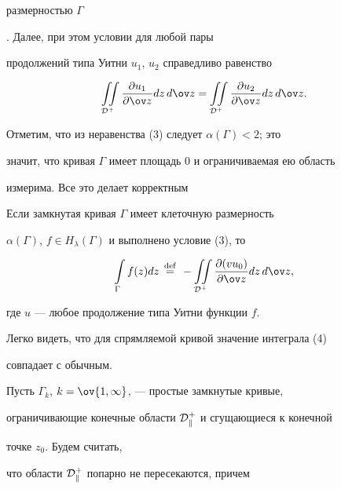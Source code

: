 размерностью $\Gamma$


\cite{14}. Далее, при этом условии для любой пары


продолжений типа Уитни $u_1$, $u_2$ справедливо равенство


$$


\iint\limits_{\cal D^+}\frac{\partial u_1}{\partial\ov z}


dz\,d\ov z=\iint\limits_{\cal D^+}


\frac{\partial u_2}{\partial\ov z}dz\,d\ov z.


$$


Отметим, что из неравенства (3) следует $\alpha(\Gamma)<2$; это


значит, что кривая $\Gamma$ имеет площадь 0 и ограничиваемая ею область


измерима. Все это делает корректным





\begin{defn}


Если замкнутая кривая $\Gamma$ имеет клеточную размерность


$\alpha(\Gamma)$, $f\in H_\lambda(\Gamma)$ и выполнено условие (3), то


\begin{equation}


\int\limits_\Gamma f(z)dz\,\overset{\text{def}}{=}{}\,


-\iint\limits_{\cal D^+}\frac{\partial(v u_0)}{\partial\ov z}dz\,d\ov z,


\end{equation}


где $u$ --- любое продолжение типа Уитни функции $f$.


\end{defn}





Легко видеть, что для спрямляемой кривой значение интеграла (4)


совпадает с обычным.





Пусть $\Gamma_k$, $k=\ov{1,\infty}$, --- простые замкнутые кривые,


ограничивающие конечные области $\cal D^+_k$ и сгущающиеся к конечной


точке $z_0$. Будем считать,


что области $\cal D^+_k$ попарно не пересекаются, причем



